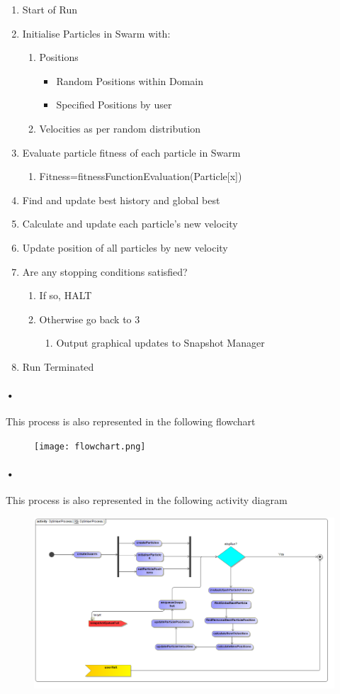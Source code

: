 \documentclass[11pt]{article}
\begin{document}
\begin{enumerate}
\item Start of Run
\item Initialise Particles in Swarm with:
	\begin{enumerate}
	\item Positions
		\begin{itemize}
		\item Random Positions within Domain
		\item Specified Positions by user

		\end{itemize}	 
	\item Velocities as per random distribution
		
	\end{enumerate}
	\item Evaluate particle fitness of each particle in Swarm
		\begin{enumerate}
		\item Fitness=fitnessFunctionEvaluation(Particle[x])
		\end{enumerate}
\item Find and update best history and global best
\item Calculate and update each particle's new velocity
\item Update position of all particles by new velocity  
\item	Are any stopping conditions satisfied?
	\begin{enumerate}
	\item If so, HALT
	\item Otherwise go back to 3
		\begin{enumerate}
		\item Output graphical updates to Snapshot Manager
		\end{enumerate}
	\end{enumerate}
	
\item Run Terminated	
\end{enumerate}

\paragraph{•}
This process is also represented in the following flowchart
\begin{figure}[H]
	\texttt{[image: flowchart.png]}
\end{figure}

\paragraph{•}
This process is also represented in the following activity diagram
\begin{figure}[H]
	\includegraphics[scale=0.40]{OptimiserProcess.png}
\end{figure}
\end{document}
